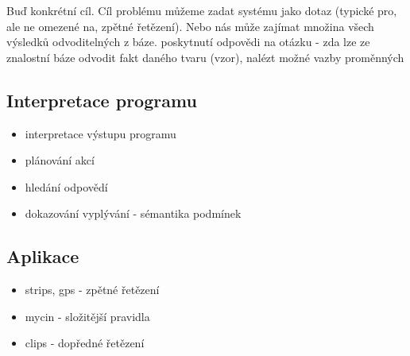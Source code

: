 Buď konkrétní cíl.
Cíl problému můžeme zadat systému jako dotaz (typické pro, ale ne omezené na,
zpětné řetězení).
Nebo nás může zajímat množina všech výsledků odvoditelných z báze.
poskytnutí odpovědi na otázku - zda lze ze znalostní báze odvodit fakt daného
tvaru (vzor), nalézt možné vazby proměnných

\subsection{Interpretace programu}
\begin{framed}
  \begin{itemize}
    \item interpretace výstupu programu
    \item plánování akcí
    \item hledání odpovědí
    \item dokazování vyplývání - sémantika podmínek
  \end{itemize}
\end{framed}

\subsection{Aplikace}
\begin{framed}
  \begin{itemize}
    \item strips, gps - zpětné řetězení
    \item mycin - složitější pravidla
    \item clips - dopředné řetězení
  \end{itemize}
\end{framed}

